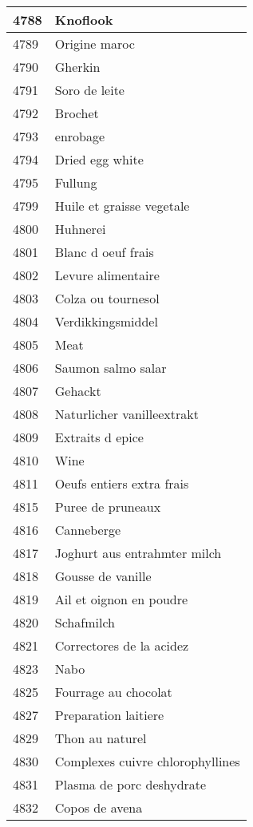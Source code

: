 \begin{longtable}{|l|l|}
4788 & Knoflook \\ \hline 
4789 & Origine maroc \\ \hline 
4790 & Gherkin \\ \hline 
4791 & Soro de leite \\ \hline 
4792 & Brochet \\ \hline 
4793 & enrobage \\ \hline 
4794 & Dried egg white \\ \hline 
4795 & Fullung \\ \hline 
4799 & Huile et graisse vegetale \\ \hline 
4800 & Huhnerei \\ \hline 
4801 & Blanc d oeuf frais \\ \hline 
4802 & Levure alimentaire \\ \hline 
4803 & Colza ou tournesol \\ \hline 
4804 & Verdikkingsmiddel \\ \hline 
4805 & Meat \\ \hline 
4806 & Saumon salmo salar \\ \hline 
4807 & Gehackt \\ \hline 
4808 & Naturlicher vanilleextrakt \\ \hline 
4809 & Extraits d epice \\ \hline 
4810 & Wine \\ \hline 
4811 & Oeufs entiers extra frais \\ \hline 
4815 & Puree de pruneaux \\ \hline 
4816 & Canneberge \\ \hline 
4817 & Joghurt aus entrahmter milch \\ \hline 
4818 & Gousse de vanille \\ \hline 
4819 & Ail et oignon en poudre \\ \hline 
4820 & Schafmilch \\ \hline 
4821 & Correctores de la acidez \\ \hline 
4823 & Nabo \\ \hline 
4825 & Fourrage au chocolat \\ \hline 
4827 & Preparation laitiere \\ \hline 
4829 & Thon au naturel \\ \hline 
4830 & Complexes cuivre chlorophyllines \\ \hline 
4831 & Plasma de porc deshydrate \\ \hline 
4832 & Copos de avena \\ \hline 

\end{longtable}
